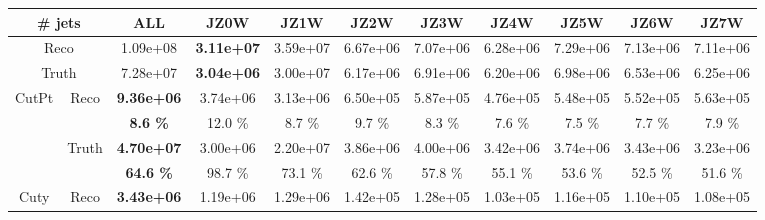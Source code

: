 \begin{appendices}
\begin{landscape} 
\begin{table}
  \scriptsize
  \centering
  \begin{tabular}{|c|c|>{\bfseries}c|c|c|c|c|c|c|c|c|}
    \hline
     \multicolumn{2}{|c|}{\# jets}  & ALL      & JZ0W     & JZ1W     & JZ2W     & JZ3W     & JZ4W     & JZ5W     & JZ6W     & JZ7W     \\
    \hline                                                              
    \hline                                                              
     \multicolumn{2}{|c|}{Reco}                               & 1.09e+08 & 3.11e+07 & 3.59e+07 & 6.67e+06 & 7.07e+06 & 6.28e+06 & 7.29e+06 & 7.13e+06 & 7.11e+06 \\
    \hline                                                                                          
     \multicolumn{2}{|c|}{Truth}                                & 7.28e+07 & 3.04e+06 & 3.00e+07 & 6.17e+06 & 6.91e+06 & 6.20e+06 & 6.98e+06 & 6.53e+06 & 6.25e+06 \\
    \hline                                                                                      
    \hline                                                                                      
    \multirow{4}{*}{CutPt}          & \multirow{2}{*}{Reco}   & 9.36e+06 & 3.74e+06 & 3.13e+06 & 6.50e+05 & 5.87e+05 & 4.76e+05 & 5.48e+05 & 5.52e+05 & 5.63e+05 \\
                                    &                           & 8.6 \%   & 12.0 \%  & 8.7 \%   & 9.7 \%   & 8.3 \%   & 7.6 \%   & 7.5 \%   & 7.7 \%   & 7.9 \%   \\
    \cline{2-11}                                                                                
                                    & \multirow{2}{*}{Truth}    & 4.70e+07 & 3.00e+06 & 2.20e+07 & 3.86e+06 & 4.00e+06 & 3.42e+06 & 3.74e+06 & 3.43e+06 & 3.23e+06 \\
                                    &                           & 64.6 \%  & 98.7 \%  & 73.1 \%  & 62.6 \%  & 57.8 \%  & 55.1 \%  & 53.6 \%  & 52.5 \%  & 51.6 \%  \\
    \hline                                                                                      
    \hline                                                                                      
    \multirow{4}{*}{Cuty}           & \multirow{2}{*}{Reco}   & 3.43e+06 & 1.19e+06 & 1.29e+06 & 1.42e+05 & 1.28e+05 & 1.03e+05 & 1.16e+05 & 1.10e+05 & 1.08e+05 \\

\end{tabular}
\end{table}
\end{landscape}
\end{appendices}
